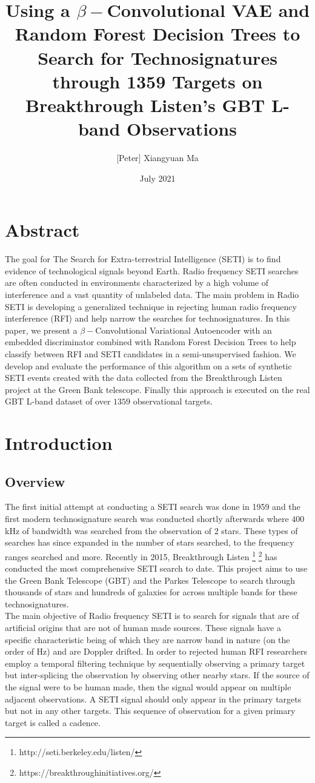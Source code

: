 \documentclass{article}
\title{Using a $\beta -$Convolutional VAE and Random Forest Decision Trees to Search for Technosignatures through 1359 Targets on Breakthrough Listen's GBT L-band Observations }
\author{[Peter] Xiangyuan Ma }
\date{July 2021}
\begin{document}
\maketitle

\section*{Abstract}
The goal for The Search for Extra-terrestrial Intelligence (SETI) is to find 
evidence of technological signals beyond Earth. Radio frequency SETI searches are often conducted in environments characterized by a high volume of interference and a vast quantity of unlabeled data. The main problem in Radio SETI is developing a generalized technique in rejecting human radio frequency interference (RFI) and help narrow the searches for technosignatures. In this paper, we present a $\beta -$Convolutional Variational Autoencoder with an embedded discriminator combined with Random Forest Decision Trees to help classify between RFI and SETI candidates in a semi-unsupervised fashion. We develop and evaluate the performance of this algorithm on a sets of synthetic SETI events created with the data collected from the Breakthrough Listen project at the Green Bank telescope. Finally this approach is executed on the real GBT L-band dataset of over $1359$ observational targets.  
\section{Introduction}
\subsection{Overview}
The first initial attempt at conducting a SETI search was done in 1959  and the first modern technosignature search was conducted shortly afterwards where $400 $kHz of bandwidth was searched from the observation of 2 stars. These types of searches has since expanded in the number of stars searched, to the frequency ranges searched and more. Recently in 2015, Breakthrough Listen \footnote{http://seti.berkeley.edu/listen/} \footnote{https://breakthroughinitiatives.org/}  has conducted the most comprehensive SETI search to date. This project aims to use the Green Bank Telescope (GBT) and the Parkes Telescope to search through thousands of stars and hundreds of galaxies for across multiple bands for these technosignatures. \\

The main objective of Radio frequency SETI is to search for signals that are of artificial origins that are not of human made sources. These signals have a specific characteristic being of which they are narrow band in nature (on the order of Hz) and are Doppler drifted. In order to rejected human RFI researchers employ a temporal filtering technique by sequentially observing a primary target but inter-splicing the observation by observing other nearby stars. If the source of the signal were to be human made, then the signal would appear on multiple adjacent observations. A SETI signal should only appear in the primary targets but not in any other targets. This sequence of observation for a given primary target is called a cadence.\\
\end{document}
